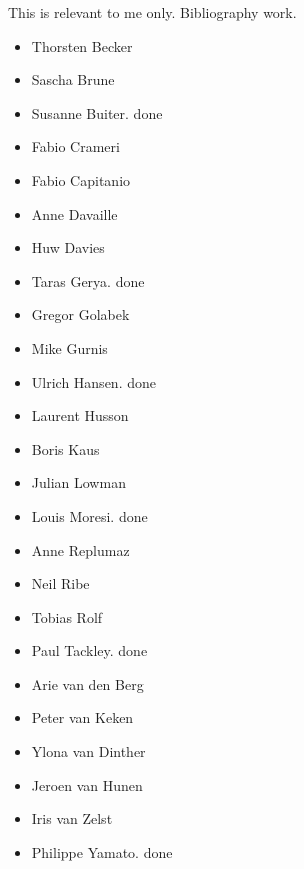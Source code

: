 
This is relevant to me only. Bibliography work.
\begin{itemize}
\item Thorsten Becker
\item Sascha Brune
\item Susanne Buiter. done
\item Fabio Crameri
\item Fabio Capitanio
\item Anne Davaille
\item Huw Davies
\item Taras Gerya. done
\item Gregor Golabek
\item Mike Gurnis
\item Ulrich Hansen. done
\item Laurent Husson
\item Boris Kaus 
\item Julian Lowman
\item Louis Moresi. done
\item Anne Replumaz
\item Neil Ribe
\item Tobias Rolf
\item Paul Tackley. done
\item Arie van den Berg
\item Peter van Keken 
\item Ylona van Dinther
\item Jeroen van Hunen
\item Iris van Zelst
\item Philippe Yamato. done
\end{itemize}
